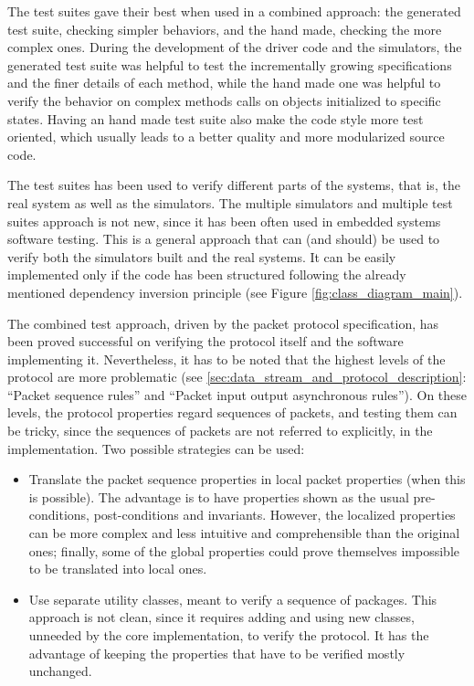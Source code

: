 \documentclass{article} \usepackage{times}
\begin{document}
The test suites gave their best when used in a combined approach: the
generated test suite, checking simpler behaviors, and the hand made,
checking the more complex ones.  During the development of the driver
code and the simulators, the generated test suite was helpful to test
the incrementally growing specifications and the finer details of each
method, while the hand made one was helpful to verify the behavior on
complex methods calls on objects initialized to specific
states. Having an hand made test suite also make the code style more
test oriented, which usually leads to a better quality and more
modularized source code\cite{Binder1999}.

The test suites has been used to verify different parts of the
systems, that is, the real system as well as the simulators.  The
multiple simulators and multiple test suites approach is not new,
since it has been often used in embedded systems software
testing\cite{Broekman2002}.  This is a general approach that can (and
should) be used to verify both the simulators built and the real
systems.  It can be easily implemented only if the code has been
structured following the already mentioned dependency inversion
principle\cite{martin1996dependency} (see Figure
\ref{fig:class_diagram_main}).

The combined test approach, driven by the packet protocol
specification, has been proved successful on verifying the protocol
itself and the software implementing it.  Nevertheless, it has to be
noted that the highest levels of the protocol are more problematic
(see \ref{sec:data_stream_and_protocol_description}: ``Packet sequence
rules'' and ``Packet input output asynchronous rules'').  On these
levels, the protocol properties regard sequences of packets, and
testing them can be tricky, since the sequences of packets are not
referred to explicitly, in the implementation.  Two possible
strategies can be used:
 
\begin{itemize}
\item Translate the packet sequence properties in local packet
  properties (when this is possible).  The advantage is to have
  properties shown as the usual pre-conditions, post-conditions and
  invariants.  However, the localized properties can be more complex
  and less intuitive and comprehensible than the original ones;
  finally, some of the global properties could prove themselves
  impossible to be translated into local ones.
\item Use separate utility classes, meant to verify a sequence of
  packages.  This approach is not clean, since it requires adding and
  using new classes, unneeded by the core implementation, to verify
  the protocol.  It has the advantage of keeping the properties that
  have to be verified mostly unchanged.
\end{itemize}
\end{document}
